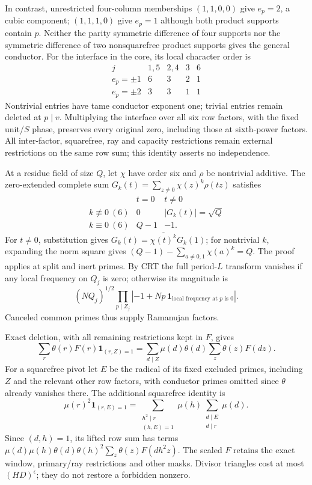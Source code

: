 \documentclass[11pt,oneside,openany]{book}
\theoremstyle{definition}\newtheorem{definition}[theorem]{Definition}
\theoremstyle{remark}\newtheorem{remark}[theorem]{Remark}
\begin{document}
In contrast, unrestricted four-column memberships $(1,1,0,0)$ give
$e_p=2$, a cubic component; $(1,1,1,0)$ give $e_p=1$ although both
product supports contain $p$. Neither the parity symmetric difference
of four supports nor the symmetric difference of two nonsquarefree
product supports gives the general conductor.
For the interface in the core, its local character order is
\[
 \begin{array}{c|cccc}
 j&1,5&2,4&3&6\\ \hline
 e_p=\pm1&6&3&2&1\\
 e_p=\pm2&3&3&1&1
 \end{array}
\]
Nontrivial entries have tame conductor exponent one; trivial entries
remain deleted at $p\mid v$. Multiplying the interface over all six
row factors, with the fixed unit/$S$ phase, preserves every original
zero, including those at sixth-power factors. All inter-factor,
squarefree, ray and capacity restrictions remain external restrictions
on the same row sum; this identity asserts no independence.

At a residue field of size $Q$, let $\chi$ have order six and $\rho$
be nontrivial additive. The zero-extended complete sum
$G_k(t)=\sum_{z\ne0}\chi(z)^k\rho(tz)$ satisfies
\[
 \begin{array}{c|cc}
 &t=0&t\ne0\\ \hline
 k\not\equiv0\ (6)&0&|G_k(t)|=\sqrt Q\\
 k\equiv0\ (6)&Q-1&-1.
 \end{array}
\]
For $t\ne0$, substitution gives
$G_k(t)=\overline{\chi(t)^k}G_k(1)$; for nontrivial $k$,
expanding the norm square gives
$(Q-1)-\sum_{a\ne0,1}\chi(a)^k=Q$.
The proof applies at split and inert primes. By CRT the full period-$L$
transform vanishes if any local frequency on $Q_j$ is zero; otherwise
its magnitude is
\[
 (NQ_j)^{1/2}
 \prod_{p\mid Z_j}
 \left|-1+Np\,\mathbf1_{\text{local frequency at }p\text{ is }0}\right|.
\]
Canceled common primes thus supply Ramanujan factors.

Exact deletion, with all remaining restrictions kept in $F$, gives
\[
 \sum_r\theta(r)F(r)\mathbf1_{(r,Z)=1}
 =\sum_{d\mid Z}\mu(d)\theta(d)\sum_z\theta(z)F(dz).
\]
For a squarefree pivot let $E$ be the radical of its fixed excluded
primes, including $Z$ and the relevant other row factors, with
conductor primes omitted since $\theta$ already vanishes there.
The additional squarefree identity is
\[
 \mu(r)^2\mathbf1_{(r,E)=1}
 =\sum_{\substack{h^2\mid r\\(h,E)=1}}\mu(h)
       \sum_{\substack{d\mid E\\d\mid r}}\mu(d).
\]
Since $(d,h)=1$, its lifted row sum has terms
$\mu(d)\mu(h)\theta(d)\theta(h)^2\sum_z\theta(z)F(dh^2z)$.
The scaled $F$ retains the exact window, primary/ray restrictions and
other masks. Divisor triangles cost at most $(HD)^\epsilon$;
they do not restore a forbidden nonzero.
\end{document}
